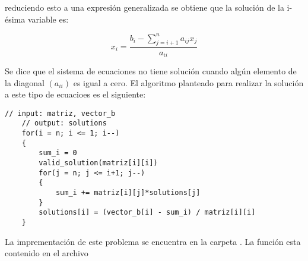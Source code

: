 reduciendo esto a una expresión generalizada se obtiene que la solución de la i-ésima variable es:

\begin{equation*}
    x_i = \frac{b_{i}-\sum\limits_{j=i+1}^n a_{ij}x_{j}}{a_{ii}}
\end{equation*}

Se dice que el sistema de ecuaciones no tiene solución cuando algún elemento de la diagonal $(a_{ii})$ es igual a cero. El algoritmo planteado para realizar la solución a este tipo de ecuacioes es el siguiente:

\begin{lstlisting}[style=CStyle]
    // input: matriz, vector_b
    // output: solutions
    for(i = n; i <= 1; i--)
    {
        sum_i = 0
        valid_solution(matriz[i][i])
        for(j = n; j <= i+1; j--)
        {
            sum_i += matriz[i][j]*solutions[j]
        }
        solutions[i] = (vector_b[i] - sum_i) / matriz[i][i]
    }

\end{lstlisting}

La imprementación de este problema se encuentra en la carpeta . La función  esta contenido en el archivo 